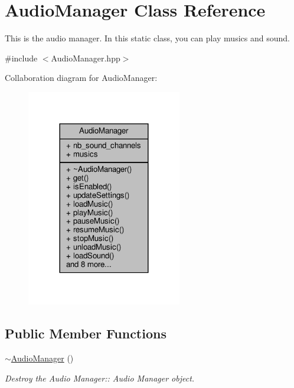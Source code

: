 \hypertarget{class_audio_manager}{}\section{Audio\+Manager Class Reference}
\label{class_audio_manager}


This is the audio manager. In this static class, you can play musics and sound.  




{\ttfamily \#include $<$Audio\+Manager.\+hpp$>$}



Collaboration diagram for Audio\+Manager\+:
\nopagebreak
\begin{figure}[H]
\begin{center}
\leavevmode
\includegraphics[width=192pt]{class_audio_manager__coll__graph}
\end{center}
\end{figure}
\subsection*{Public Member Functions}
\begin{DoxyCompactItemize}
\item 
\mbox{\label{class_audio_manager_ad94dc46723c6d7cf8c81fc3772a842aa}} 
\hyperlink{class_audio_manager_ad94dc46723c6d7cf8c81fc3772a842aa}{$\sim$\+Audio\+Manager} ()
\begin{DoxyCompactList}\small\item\em Destroy the Audio Manager\+:\+: Audio Manager object. \end{DoxyCompactList}\end{DoxyCompactItemize}
